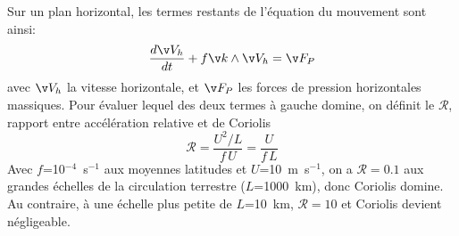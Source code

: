 \sk
Sur un plan horizontal, les termes restants de l'équation du mouvement sont ainsi:
\[  \frac{d\v V_h}{dt}+f\v k\wedge\v V_h=\v F_P  \]
avec $\v V_h$ la vitesse horizontale, et $\v F_P$ les forces de pression horizontales massiques. Pour évaluer lequel des deux termes à gauche domine, on définit le  $\mathcal{R}$, rapport entre accélération relative et de Coriolis
\[ \mathcal{R} = \frac{U^2/L}{f\,U} = \frac{U}{f\,L} \]
Avec $f$=10$^{-4}$~s$^{-1}$ aux moyennes latitudes et $U$=10~m~s$^{-1}$, on a $\mathcal{R}=0.1$ aux grandes échelles de la circulation terrestre ($L$=1000~km), donc Coriolis domine. Au contraire, à une échelle plus petite de $L$=10~km, $\mathcal{R}=10$ et Coriolis devient négligeable.


